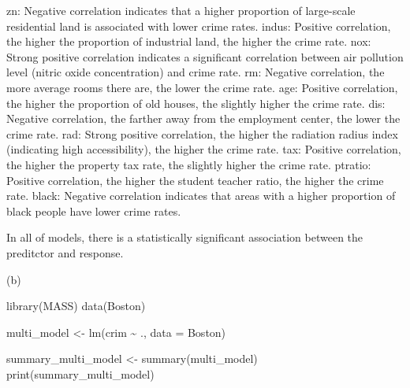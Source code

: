 \documentclass[
]{article}
\newenvironment{Shaded}{\begin{snugshade}}{\end{snugshade}}
\newcommand{\AttributeTok}[1]{\textcolor[rgb]{0.40,0.45,0.13}{#1}}
\newcommand{\FunctionTok}[1]{\textcolor[rgb]{0.28,0.35,0.67}{#1}}
\newcommand{\NormalTok}[1]{\textcolor[rgb]{0.00,0.23,0.31}{#1}}
\newcommand{\OtherTok}[1]{\textcolor[rgb]{0.00,0.23,0.31}{#1}}
\newcommand{\SpecialCharTok}[1]{\textcolor[rgb]{0.37,0.37,0.37}{#1}}
\begin{document}
zn: Negative correlation indicates that a higher proportion of
large-scale residential land is associated with lower crime rates.
indus: Positive correlation, the higher the proportion of industrial
land, the higher the crime rate. nox: Strong positive correlation
indicates a significant correlation between air pollution level (nitric
oxide concentration) and crime rate. rm: Negative correlation, the more
average rooms there are, the lower the crime rate. age: Positive
correlation, the higher the proportion of old houses, the slightly
higher the crime rate. dis: Negative correlation, the farther away from
the employment center, the lower the crime rate. rad: Strong positive
correlation, the higher the radiation radius index (indicating high
accessibility), the higher the crime rate. tax: Positive correlation,
the higher the property tax rate, the slightly higher the crime rate.
ptratio: Positive correlation, the higher the student teacher ratio, the
higher the crime rate. black: Negative correlation indicates that areas
with a higher proportion of black people have lower crime rates.

In all of models, there is a statistically significant association
between the preditctor and response.

(b)

\begin{Shaded}
\begin{Highlighting}[]
\FunctionTok{library}\NormalTok{(MASS)}
\FunctionTok{data}\NormalTok{(Boston)}

\NormalTok{multi\_model }\OtherTok{\textless{}{-}} \FunctionTok{lm}\NormalTok{(crim }\SpecialCharTok{\textasciitilde{}}\NormalTok{ ., }\AttributeTok{data =}\NormalTok{ Boston)}

\NormalTok{summary\_multi\_model }\OtherTok{\textless{}{-}} \FunctionTok{summary}\NormalTok{(multi\_model)}
\FunctionTok{print}\NormalTok{(summary\_multi\_model)}
\end{Highlighting}
\end{Shaded}
\end{document}
